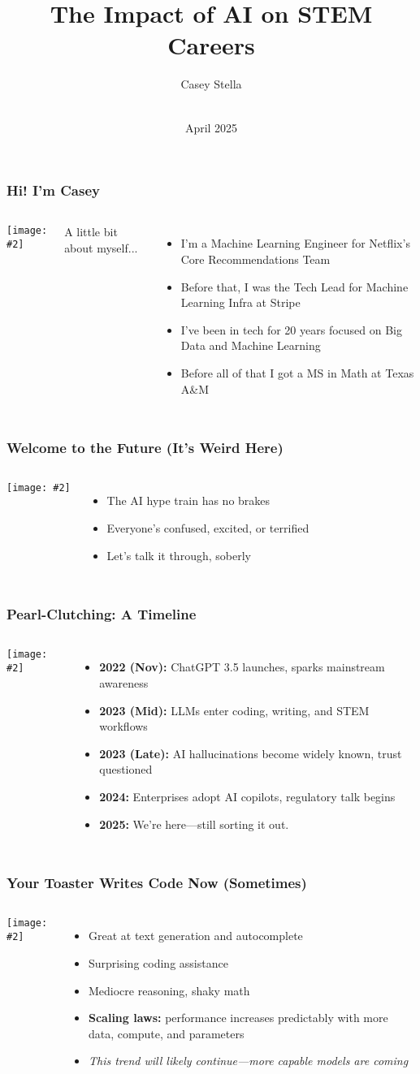 \documentclass{beamer}
\title{The Impact of AI on STEM Careers}
\author{Casey Stella}
\date{\\April 2025}
\newcommand{\slidewithimage}[3]{%
  \begin{frame}
    \frametitle{#1}
    \begin{columns}
      \column{0.5\textwidth}
        \texttt{[image: \#2]}\\[1em]
      \column{0.5\textwidth}
        #3
    \end{columns}
  \end{frame}
}
\begin{document}
\begin{frame}
  \titlepage
\end{frame}

\slidewithimage{Hi! I'm Casey}{me-and-robot.png}{
  A little bit about myself...
  \begin{itemize}
    \item I'm a Machine Learning Engineer for Netflix's Core Recommendations Team
    \item Before that, I was the Tech Lead for Machine Learning Infra at Stripe
    \item I've been in tech for 20 years focused on Big Data and Machine Learning
    \item Before all of that I got a MS in Math at Texas A\&M
  \end{itemize}
}

\slidewithimage{Welcome to the Future (It’s Weird Here)}{future-image.png}{
  \begin{itemize}
    \item The AI hype train has no brakes
    \item Everyone’s confused, excited, or terrified
    \item Let's talk it through, soberly
  \end{itemize}
}

\slidewithimage{Pearl-Clutching: A Timeline}{timeline-image.png}{
  \begin{itemize}
    \item \textbf{2022 (Nov):} ChatGPT 3.5 launches, sparks mainstream awareness
    \item \textbf{2023 (Mid):} LLMs enter coding, writing, and STEM workflows
    \item \textbf{2023 (Late):} AI hallucinations become widely known, trust questioned
    \item \textbf{2024:} Enterprises adopt AI copilots, regulatory talk begins
    \item \textbf{2025:} We’re here—still sorting it out.
  \end{itemize}
}

\slidewithimage{Your Toaster Writes Code Now (Sometimes)}{capabilities-image.png}{
  \begin{itemize}
    \item Great at text generation and autocomplete
    \item Surprising coding assistance
    \item Mediocre reasoning, shaky math
    \item \textbf{Scaling laws:} performance increases predictably with more data, compute, and parameters
    \item \textit{This trend will likely continue—more capable models are coming}
  \end{itemize}
}
\end{document}
